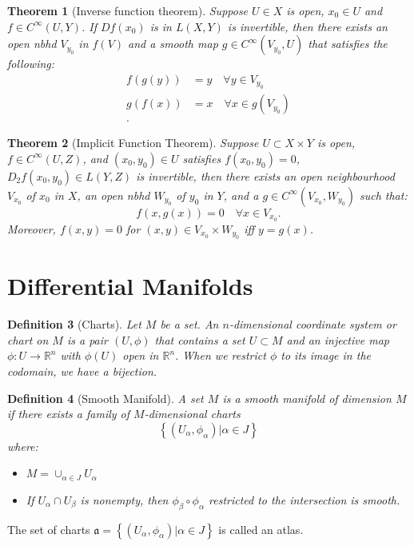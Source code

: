 \documentclass{article}
\newtheorem{theorem}{Theorem}
\newtheorem{definition}[theorem]{Definition}
\theoremstyle{definition}
\numberwithin{theorem}{section}
\numberwithin{equation}{section}
\begin{document}
\begin{theorem}[Inverse function theorem]
	Suppose $U \in X$ is open, $x_0 \in U$ and $f \in C^\infty(U, Y)$. If $D f(x_0)$ is in $L(X, Y)$ is invertible, then there exists an open nbhd $V_{y_0}$ in $f(V)$ and a smooth map $g \in C^\infty(V_{y_0}, U)$ that satisfies the following:
	\begin{align*}
		f(g(y)) &= y \quad \forall y \in V_{y_0}\\
		g(f(x)) &= x \quad \forall x \in g(V_{y_0})\\.
	\end{align*}
\end{theorem}

\begin{theorem}[Implicit Function Theorem]
	Suppose $U \subset X \times Y$ is open, $f \in C^\infty(U, Z)$, and $(x_0, y_0) \in U$ satisfies $f(x_0, y_0) = 0$, $D_2 f(x_0, y_0) \in L(Y, Z)$ is invertible, then there exists an open neighbourhood $V_{x_0}$ of $x_0$ in $X$, an open nbhd $W_{y_0}$ of $y_0$ in $Y$, and a $g \in C^\infty(V_{x_0}, W_{y_0})$ such that:
	\begin{equation}
		f(x, g(x)) = 0 \quad \forall x \in V_{x_0}.
	\end{equation}
	Moreover, $f(x, y) = 0$ for $(x, y) \in V_{x_0} \times W_{y_0}$ iff $y = g(x)$. 
\end{theorem}

\section{Differential Manifolds}
\begin{definition}[Charts]
	Let $M$ be a set. An $n$-dimensional coordinate system or chart on $M$ is a pair $(U, \phi)$ that contains a set $U \subset M$ and an injective map $\phi: U \rightarrow \mathbb{R}^n$ with $\phi(U)$ open in $\mathbb{R}^n$. When we restrict $\phi$ to its image in the codomain, we have a bijection.
\end{definition}

\begin{definition}[Smooth Manifold]
	A set $M$ is a smooth manifold of dimension $M$ if there exists a family of $M$-dimensional charts 
	\begin{equation}
		\left\{ (U_{\alpha}, \phi_\alpha) | \alpha \in J \right\}
	\end{equation}
	where:
	\begin{itemize}
		\item $M = \cup_{\alpha \in J} U_\alpha$
		\item If $U_\alpha \cap U_\beta$ is nonempty, then $\phi_\beta \circ \phi_\alpha$ restricted to the intersection is smooth. 
	\end{itemize}
\end{definition}
The set of charts $\mathfrak{a} = \left\{ (U_{\alpha}, \phi_\alpha) | \alpha \in J \right\}$ is called an atlas. 
\end{document}
